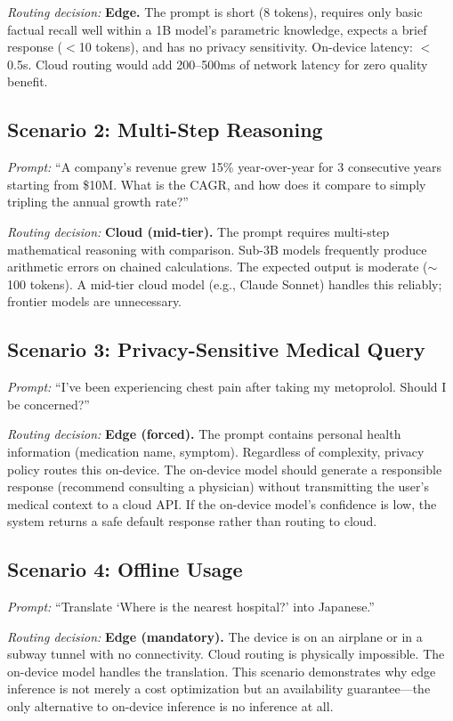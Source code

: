 \documentclass[12pt, letterpaper, twoside]{report}
\begin{document}
\textit{Routing decision:} \textbf{Edge.} The prompt is short (8 tokens), requires only basic factual recall well within a 1B model's parametric knowledge, expects a brief response ($<$10 tokens), and has no privacy sensitivity. On-device latency: $<$0.5s. Cloud routing would add 200--500ms of network latency for zero quality benefit.

\subsection{Scenario 2: Multi-Step Reasoning}

\textit{Prompt:} ``A company's revenue grew 15\% year-over-year for 3 consecutive years starting from \$10M. What is the CAGR, and how does it compare to simply tripling the annual growth rate?''

\textit{Routing decision:} \textbf{Cloud (mid-tier).} The prompt requires multi-step mathematical reasoning with comparison. Sub-3B models frequently produce arithmetic errors on chained calculations. The expected output is moderate ($\sim$100 tokens). A mid-tier cloud model (e.g., Claude Sonnet) handles this reliably; frontier models are unnecessary.

\subsection{Scenario 3: Privacy-Sensitive Medical Query}

\textit{Prompt:} ``I've been experiencing chest pain after taking my metoprolol. Should I be concerned?''

\textit{Routing decision:} \textbf{Edge (forced).} The prompt contains personal health information (medication name, symptom). Regardless of complexity, privacy policy routes this on-device. The on-device model should generate a responsible response (recommend consulting a physician) without transmitting the user's medical context to a cloud API. If the on-device model's confidence is low, the system returns a safe default response rather than routing to cloud.

\subsection{Scenario 4: Offline Usage}

\textit{Prompt:} ``Translate `Where is the nearest hospital?' into Japanese.''

\textit{Routing decision:} \textbf{Edge (mandatory).} The device is on an airplane or in a subway tunnel with no connectivity. Cloud routing is physically impossible. The on-device model handles the translation. This scenario demonstrates why edge inference is not merely a cost optimization but an availability guarantee---the only alternative to on-device inference is no inference at all.
\end{document}
